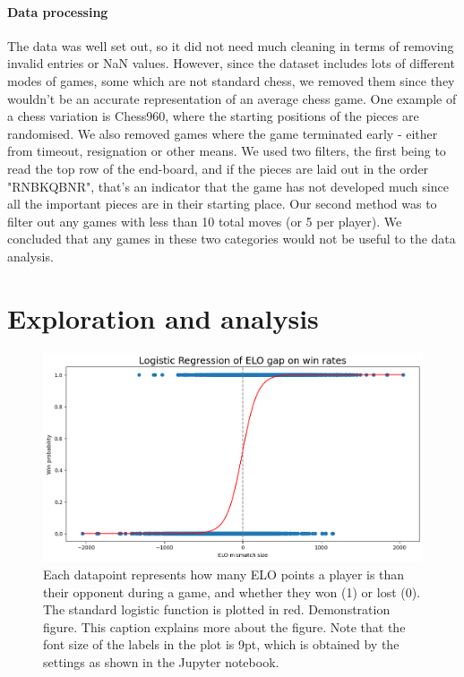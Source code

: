 \documentclass[10pt,a4paper,twocolumn]{article}
\begin{document}
\paragraph{Data processing}
The data was well set out, so it did not need much cleaning in terms of removing invalid entries or NaN values. However, since the dataset includes lots of different modes of games, some which are not standard chess, we removed them since they wouldn't be an accurate representation of an average chess game. One example of a chess variation is Chess960, where the starting positions of the pieces are randomised.
We also removed games where the game terminated early - either from timeout, resignation or other means. We used two filters, the first being to read the top row of the end-board, and if the pieces are laid out in the order "RNBKQBNR", that's an indicator that the game has not developed much since all the important pieces are in their starting place. Our second method was to filter out any games with less than 10 total moves (or 5 per player). We concluded that any games in these two categories would not be useful to the data analysis.

\section{Exploration and  analysis}

\begin{figure}[t]
  \centering
  \includegraphics{report/images/log_regression.png}
  \caption{Each datapoint represents how many ELO points a player is than their opponent during a game, and whether they won (1) or lost (0). The standard logistic function is plotted in red.
  Demonstration figure. This caption explains more about the figure. Note that the font size of the labels in the plot is 9pt, which is obtained by the settings as shown in the Jupyter notebook.}
  \label{fds-project-template:fig:log_regression}
\end{figure}
\end{document}
